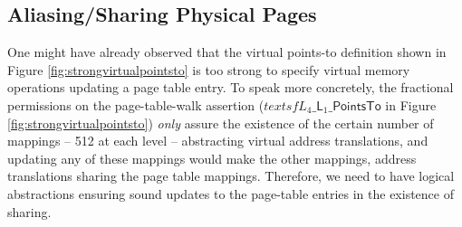   \subsection{Aliasing/Sharing Physical Pages}
  \label{sec:sharingpages}  
  One might have already observed that the virtual points-to definition shown in Figure \ref{fig:strongvirtualpointsto} is too strong to specify virtual memory operations updating a page table entry. To speak more concretely, the fractional permissions on the page-table-walk assertion ($textsf{L}_{4}\_\textsf{L}_{1}\_\textsf{PointsTo}$ in Figure \ref{fig:strongvirtualpointsto}) \textit{only} assure the existence of the certain number of mappings -- 512 at each level -- abstracting virtual address translations, and updating any of these mappings would make the other mappings, address translations sharing the page table mappings. Therefore, we need to have logical abstractions ensuring sound updates to the page-table entries in the existence of sharing.
  
